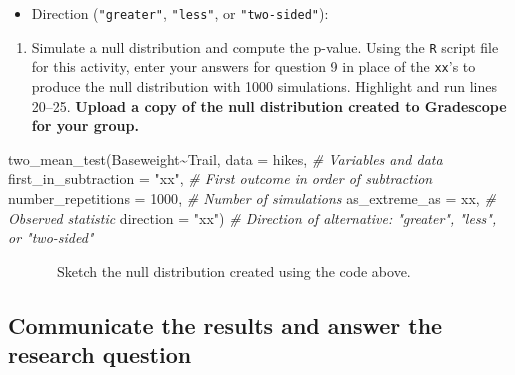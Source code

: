 \documentclass[
]{report}
\newenvironment{Shaded}{\begin{snugshade}}{\end{snugshade}}
\newcommand{\AttributeTok}[1]{\textcolor[rgb]{0.77,0.63,0.00}{#1}}
\newcommand{\CommentTok}[1]{\textcolor[rgb]{0.56,0.35,0.01}{\textit{#1}}}
\newcommand{\DecValTok}[1]{\textcolor[rgb]{0.00,0.00,0.81}{#1}}
\newcommand{\FunctionTok}[1]{\textcolor[rgb]{0.00,0.00,0.00}{#1}}
\newcommand{\NormalTok}[1]{#1}
\newcommand{\SpecialCharTok}[1]{\textcolor[rgb]{0.00,0.00,0.00}{#1}}
\newcommand{\StringTok}[1]{\textcolor[rgb]{0.31,0.60,0.02}{#1}}
\providecommand{\tightlist}{%
  \setlength{\itemsep}{0pt}\setlength{\parskip}{0pt}}
\begin{document}
\vspace{.2in}

\begin{itemize}
\tightlist
\item
  Direction (\texttt{"greater"}, \texttt{"less"}, or \texttt{"two-sided"}):
\end{itemize}

\vspace{.2in}

\begin{enumerate}
\def\labelenumi{\arabic{enumi}.}
\setcounter{enumi}{9}
\tightlist
\item
  Simulate a null distribution and compute the p-value. Using the \texttt{R} script file for this activity, enter your answers for question 9 in place of the \texttt{xx}'s to produce the null distribution with 1000 simulations. Highlight and run lines 20--25. \textbf{Upload a copy of the null distribution created to Gradescope for your group.}
\end{enumerate}

\begin{Shaded}
\begin{Highlighting}[]
\FunctionTok{two\_mean\_test}\NormalTok{(Baseweight}\SpecialCharTok{\textasciitilde{}}\NormalTok{Trail, }
         \AttributeTok{data =}\NormalTok{ hikes,  }\CommentTok{\# Variables and data}
         \AttributeTok{first\_in\_subtraction =} \StringTok{"xx"}\NormalTok{, }\CommentTok{\# First outcome in order of subtraction}
         \AttributeTok{number\_repetitions =} \DecValTok{1000}\NormalTok{,  }\CommentTok{\# Number of simulations}
         \AttributeTok{as\_extreme\_as =}\NormalTok{ xx,  }\CommentTok{\# Observed statistic}
         \AttributeTok{direction =} \StringTok{"xx"}\NormalTok{)  }\CommentTok{\# Direction of alternative: "greater", "less", or "two{-}sided"}
\end{Highlighting}
\end{Shaded}

~~~~~~~Sketch the null distribution created using the code above.

\vspace{1.5in}

\hypertarget{communicate-the-results-and-answer-the-research-question-4}{%
\subsection*{Communicate the results and answer the research question}\label{communicate-the-results-and-answer-the-research-question-4}}
\end{document}
